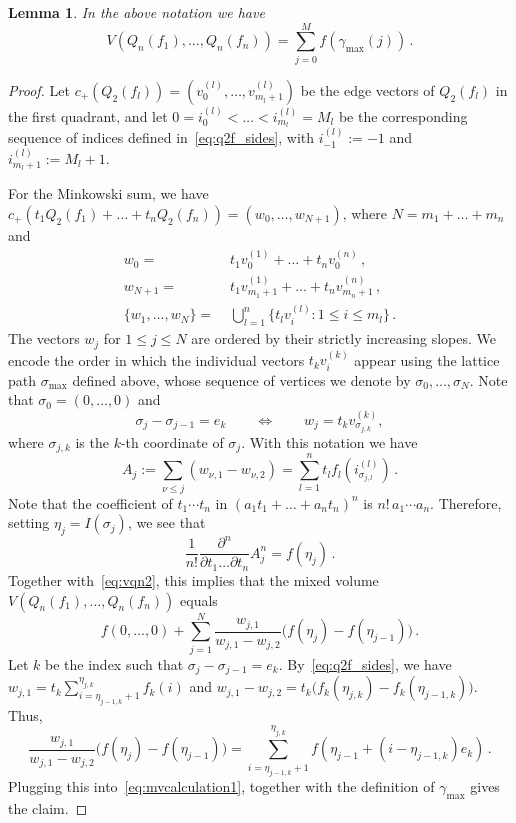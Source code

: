 \documentclass[a4paper,reqno,12pt]{amsart}
\newtheorem{lemma}[theorem]{Lemma}
\newcommand{\1}{\bo{1}}
\begin{document}
\begin{lemma} \label{lem:mixedvolumesmaller}
	In the above notation we have
	\begin{equation}
		V(Q_n(f_1),\dots,Q_n(f_n)) = \sum_{j=0}^{M}f(\gamma_{\mathrm{max}}(j))\,.
	\end{equation}
\end{lemma}
\begin{proof}
Let $c_+(Q_2(f_l)) = (v_0^{(l)},\dots,v_{m_l+1}^{(l)})$ be the edge vectors of $Q_2(f_l)$ in the first quadrant, and let $0=i_0^{(l)}<\dots<i_{m_l}^{(l)}=M_l$ be the corresponding sequence of indices defined in~\eqref{eq:q2f_sides}, with $i_{-1}^{(l)}:=-1$ and $i_{m_l+1}^{(l)}:=M_l+1$.

For the Minkowski sum, we have $c_+(t_1Q_2(f_1)+\dots+t_nQ_2(f_n))=(w_0,\dots,w_{N+1})$, where $N=m_1+\dots+m_n$ and 
\begin{align*}
	w_0 =& \;t_1v_0^{(1)}+\dots+t_nv_0^{(n)}\,,\\
	w_{N+1} =& \;t_1v_{m_1+1}^{(1)}+\dots+t_nv_{m_n+1}^{(n)}\,,\\
	\{w_1,\dots,w_N\} =& \;\textstyle\bigcup_{l=1}^n\{t_lv_i^{(l)}\colon 1\le i \le m_l\}\,.
\end{align*}
The vectors $w_j$ for $1\le j\le N$ are ordered by their strictly increasing slopes. We encode the order in which the individual vectors $t_k v_i^{(k)}$ appear using the lattice path $\sigma_{\mathrm{max}}$ defined above, whose sequence of vertices we denote by $\sigma_0,\dots,\sigma_N$. Note that $\sigma_0 = (0,\dots,0)$ and
	\[\sigma_j-\sigma_{j-1}=e_k\qquad \Leftrightarrow \qquad w_j = t_k v_{\sigma_{j,k}}^{(k)},\]
where $\sigma_{j,k}$ is the $k$-th coordinate of $\sigma_j$.
With this notation we have
	\[A_j:=\sum_{\nu\le j}(w_{\nu,1}-w_{\nu,2}) = \sum_{l=1}^{n}t_l f_l(i_{\sigma_{j,l}}^{(l)})\,.\]
Note that the coefficient of $t_1\cdots t_n$ in $(a_1t_1+\dots+a_nt_n)^n$ is $n!\,a_1\cdots a_n$. Therefore, setting $\eta_j = I(\sigma_j)$, we see that
	\[\frac{1}{n!}\frac{\partial^n}{\partial{t_1}\dots\partial{t_n}}A_j^n = f(\eta_j)\,.\]
Together with~\eqref{eq:vqn2}, this implies that the mixed volume $V(Q_n(f_1),\dots,Q_n(f_n))$ equals
	\begin{equation} \label{eq:mvcalculation1}
	f(0,\dots,0)+\sum_{j=1}^{N}\frac{w_{j,1}}{w_{j,1}-w_{j,2}}\big(f(\eta_j)-f(\eta_{j-1})\big)\,.
	\end{equation}
Let $k$ be the index such that $\sigma_j-\sigma_{j-1}=e_k$. By~\eqref{eq:q2f_sides}, we have $w_{j,1} = t_k \sum_{i=\eta_{j-1,k}+1}^{\eta_{j,k}} f_k(i)$ and $w_{j,1}-w_{j,2} = t_k \big(f_k(\eta_{j,k}) - f_k(\eta_{j-1,k})\big)$. Thus,
	\[\frac{w_{j,1}}{w_{j,1}-w_{j,2}}\big(f(\eta_j)-f(\eta_{j-1})\big) = 
	\sum_{i=\eta_{j-1,k}+1}^{\eta_{j,k}} f(\eta_{j-1} + (i - \eta_{j-1,k}) e_k)\,.\]
Plugging this into~\eqref{eq:mvcalculation1}, together with the definition of $\gamma_{\mathrm{max}}$ gives the claim.
\end{proof}
\end{document}
